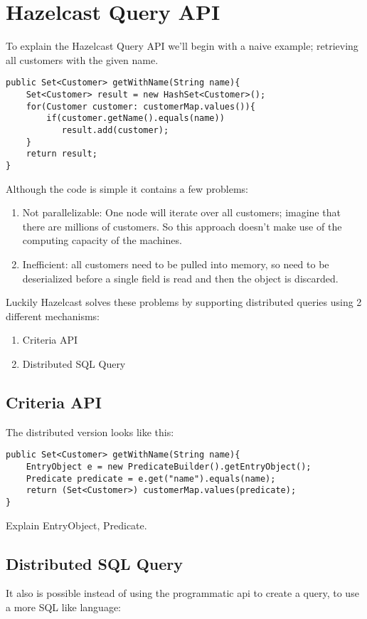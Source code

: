 \section{Hazelcast Query API}

To explain the Hazelcast Query API we'll begin with a naive example; retrieving all customers with the given name.

\begin{verbatim}
public Set<Customer> getWithName(String name){
    Set<Customer> result = new HashSet<Customer>();
    for(Customer customer: customerMap.values()){
        if(customer.getName().equals(name))
           result.add(customer);
    }
    return result;
}
\end{verbatim}

Although the code is simple it contains a few problems:
\begin{enumerate}
\item Not parallelizable: One node will iterate over all customers; imagine that there are millions of customers. So this approach doesn't make use of the computing capacity of the machines.
\item Inefficient: all customers need to be pulled into memory, so need to be deserialized before a single field is read and then the object is discarded. 
\end{enumerate}

Luckily Hazelcast solves these problems by supporting distributed queries using 2 different mechanisms:
\begin{enumerate}
\item Criteria API
\item Distributed SQL Query
\end{enumerate}

\subsection{Criteria API}

The distributed version looks like this:

\begin{verbatim}
public Set<Customer> getWithName(String name){
    EntryObject e = new PredicateBuilder().getEntryObject();
    Predicate predicate = e.get("name").equals(name);
    return (Set<Customer>) customerMap.values(predicate);
}
\end{verbatim}

Explain EntryObject, Predicate.

\subsection{Distributed SQL Query}
It also is possible instead of using the programmatic api to create a query, to use a more SQL like language:


